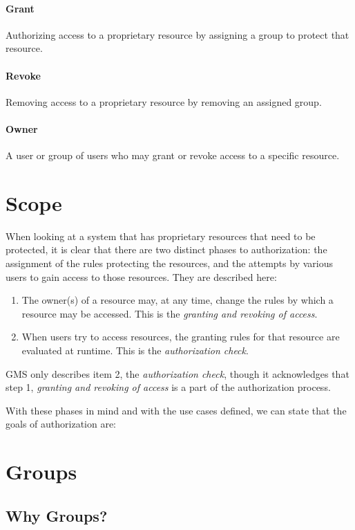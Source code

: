 \documentclass[11pt,a4paper]{ivoa}
\begin{document}
\paragraph{Grant} Authorizing access to a proprietary resource by assigning a group to protect that resource.

\paragraph{Revoke} Removing access to a proprietary resource by removing an assigned group.

\paragraph{Owner} A user or group of users who may grant or revoke access to a specific resource.

\section{Scope}

When looking at a system that has proprietary resources that need to be protected, it is clear that there are two distinct phases to authorization:  the assignment of the rules protecting the resources, and the attempts by various users to gain access to those resources.  They are described here:

\begin{enumerate}
\item The owner(s) of a resource may, at any time, change the rules by which a resource may be accessed. This is the \emph{granting and revoking of access}.
\item When users try to access resources, the granting rules for that resource are evaluated at runtime. This is the \emph{authorization check}.
\end{enumerate}

GMS only describes item 2, the \emph{authorization check}, though it acknowledges that step 1, \emph{granting and revoking of access} is a part of the authorization process.

With these phases in mind and with the use cases defined, we can state that the goals of authorization are:

\section{Groups}

\subsection{Why Groups?}
\label{subsec:whygroups}
\end{document}
